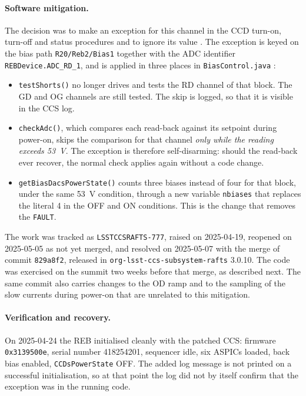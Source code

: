 \paragraph{Software mitigation.}
\label{sec:r20reb2-fix}

The decision was to make an exception for this channel in the CCD turn-on,
turn-off and status procedures and to ignore its value
\citep{jira:rafts777}. The exception is keyed on the bias path
\texttt{R20/Reb2/Bias1} together with the ADC identifier
\texttt{REBDevice.ADC\_RD\_1}, and is applied in three places in
\texttt{BiasControl.java} \citep{ccs:rafts777merge}:

\begin{itemize}
  \item \texttt{testShorts()} no longer drives and tests the RD channel of
        that block. The GD and OG channels are still tested. The skip is
        logged, so that it is visible in the CCS log.
  \item \texttt{checkAdc()}, which compares each read-back against its
        setpoint during power-on, skips the comparison for that channel
        \emph{only while the reading exceeds 53~V}. The exception is therefore
        self-disarming: should the read-back ever recover, the normal check
        applies again without a code change.
  \item \texttt{getBiasDacsPowerState()} counts three biases instead of four
        for that block, under the same 53~V condition, through a new variable
        \texttt{nbiases} that replaces the literal 4 in the OFF and ON
        conditions. This is the change that removes the \texttt{FAULT}.
\end{itemize}

The work was tracked as \texttt{LSSTCCSRAFTS-777}, raised on 2025-04-19,
reopened on 2025-05-05 as not yet merged, and resolved on 2025-05-07 with the
merge of commit \texttt{829a8f2}, released in
\texttt{org-lsst-ccs-subsystem-rafts} 3.0.10. The code was exercised on the
summit two weeks before that merge, as described next. The same commit also
carries changes to the OD ramp and to the sampling of the slow currents during
power-on that are unrelated to this mitigation.

\paragraph{Verification and recovery.}
\label{sec:r20reb2-recovery}

On 2025-04-24 the REB initialised cleanly with the patched CCS: firmware
\texttt{0x3139500e}, serial number 418254201, sequencer idle, six ASPICs
loaded, back bias enabled, \texttt{CCDsPowerState} OFF. The added log message
is not printed on a successful initialisation, so at that point the log did
not by itself confirm that the exception was in the running code.

